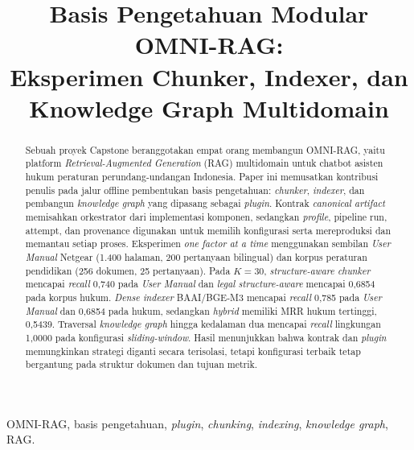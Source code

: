 \documentclass[conference,a4paper,10pt]{IEEEtran}
\title{Basis Pengetahuan Modular OMNI-RAG:\\
Eksperimen Chunker, Indexer, dan Knowledge Graph Multidomain}
\author{\IEEEauthorblockN{Moh Fairuz Alauddin Yahya}
\IEEEauthorblockA{Program Studi Informatika, Institut Teknologi Bandung\\
Bandung, Indonesia\\
13522057}}
\newcommand{\plugin}{\textit{plugin}\xspace}
\newcommand{\kg}{\textit{knowledge graph}\xspace}
\begin{document}
\maketitle

\begin{abstract}
Sebuah proyek Capstone beranggotakan empat orang membangun OMNI-RAG, yaitu platform \textit{Retrieval-Augmented Generation} (RAG) multidomain untuk chatbot asisten hukum peraturan perundang-undangan Indonesia. Paper ini memusatkan kontribusi penulis pada jalur offline pembentukan basis pengetahuan: \textit{chunker}, \textit{indexer}, dan pembangun \textit{knowledge graph} yang dipasang sebagai \plugin. Kontrak \textit{canonical artifact} memisahkan orkestrator dari implementasi komponen, sedangkan \textit{profile}, pipeline run, attempt, dan provenance digunakan untuk memilih konfigurasi serta mereproduksi dan memantau setiap proses. Eksperimen \textit{one factor at a time} menggunakan sembilan \textit{User Manual} Netgear (1.400 halaman, 200 pertanyaan bilingual) dan korpus peraturan pendidikan (256 dokumen, 25 pertanyaan). Pada $K=30$, \textit{structure-aware chunker} mencapai \textit{recall} 0,740 pada \textit{User Manual} dan \textit{legal structure-aware} mencapai 0,6854 pada korpus hukum. \textit{Dense indexer} BAAI/BGE-M3 mencapai \textit{recall} 0,785 pada \textit{User Manual} dan 0,6854 pada hukum, sedangkan \textit{hybrid} memiliki MRR hukum tertinggi, 0,5439. Traversal \kg{} hingga kedalaman dua mencapai \textit{recall} lingkungan 1,0000 pada konfigurasi \textit{sliding-window}. Hasil menunjukkan bahwa kontrak dan \plugin{} memungkinkan strategi diganti secara terisolasi, tetapi konfigurasi terbaik tetap bergantung pada struktur dokumen dan tujuan metrik.
\end{abstract}

\begin{IEEEkeywords}
OMNI-RAG, basis pengetahuan, \plugin, \textit{chunking}, \textit{indexing}, \textit{knowledge graph}, RAG.
\end{IEEEkeywords}







\balance
\printbibliography[title={Daftar Pustaka}]
\end{document}
